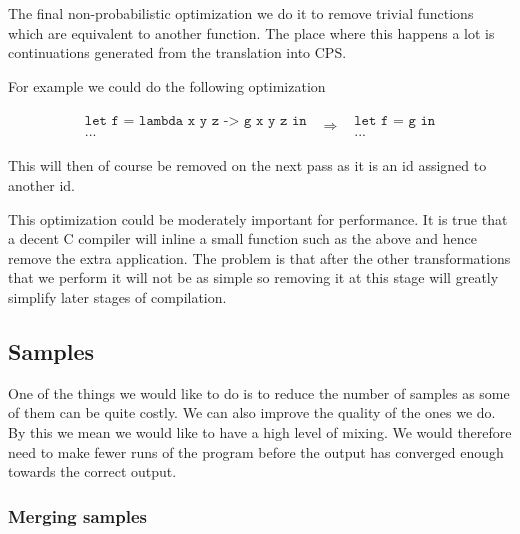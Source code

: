 \documentclass[a4paper]{article}
\newcommand{\optimization}[2]{
	\[
		\begin{array}{rcl}
			#1 & \Rightarrow & #2
		\end{array}
	\]
}
\begin{document}
The final non-probabilistic optimization we do it to remove trivial functions which are equivalent to another function. The place where this happens a lot is continuations generated from the translation into CPS.

For example we could do the following optimization
\optimization{
	\begin{array}{l}
		\texttt{let f = lambda x y z -> g x y z in} \\
		\texttt{...}
	\end{array}
}{
	\begin{array}{l}
		\texttt{let f = g in} \\
		\texttt{...}
	\end{array}
}
This will then of course be removed on the next pass as it is an id assigned to another id.

This optimization could be moderately important for performance. It is true that a decent C compiler will inline a small function such as the above and hence remove the extra application. The problem is that after the other transformations that we perform it will not be as simple so removing it at this stage will greatly simplify later stages of compilation.




\subsection{Samples}

One of the things we would like to do is to reduce the number of samples as some of them can be quite costly. We can also improve the quality of the ones we do. By this we mean we would like to have a high level of mixing. We would therefore need to make fewer runs of the program before the output has converged enough towards the correct output.




\subsubsection{Merging samples}
\end{document}
